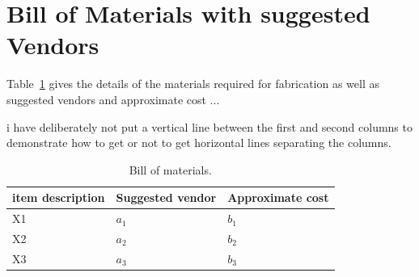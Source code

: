 \section{Bill of Materials with suggested Vendors}
Table~\ref{tab:bill_materials} gives the details of the materials required for fabrication as well as suggested vendors and approximate cost ...

i have deliberately not put a vertical line between the first and second columns to demonstrate how to get or not to get horizontal lines separating the columns.
%
\begin{table}
\begin{center}
\caption{Bill of materials.}
   \begin{tabular}{|ll|l|}
   \hline
item description & Suggested vendor & Approximate cost \\ \hline
 X1 & $a_1$ & $b_1$  \\ \hline
 X2 & $a_2$ & $b_2$ \\ \hline
 X3 & $a_3$ & $b_3$ \\ \hline
   \end{tabular}
\label{tab:bill_materials}
\end{center}
\end{table}
%
%
